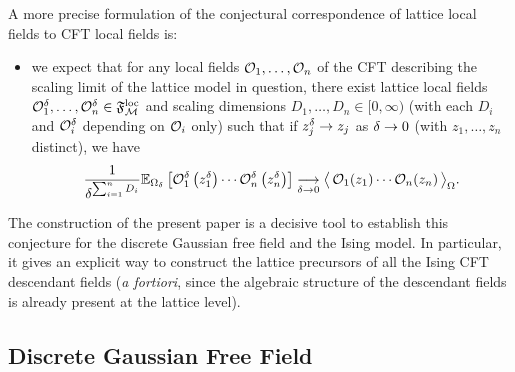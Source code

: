 \documentclass[12pt,oneside,english]{amsart}
\numberwithin{equation}{section}
\numberwithin{figure}{section}
\theoremstyle{plain}
\theoremstyle{plain}
\theoremstyle{plain}
\theoremstyle{plain}
\theoremstyle{remark}
\theoremstyle{definition}
\theoremstyle{plain}
\theoremstyle{plain}
\numberwithin{thm}{section}
\begin{document}
A more precise formulation of the conjectural correspondence of 
lattice local fields to CFT local fields is:
\begin{itemize}
\item we expect that for any local fields
${\mathcal{O}}_{1}, \ldots, {\mathcal{O}}_{n}$ of the CFT describing the scaling limit of 
the lattice model in question, %
there exist lattice local fields
$ {\mathcal{O}}_{1}^{ {\delta}}, \ldots,  {\mathcal{O}}_{n}^{ {\delta}} \in \mathfrak{F}^\mathrm{loc}_{\mathcal{M}}$ 
and scaling dimensions
$D_{1}, \ldots, D_{n} \in [0,\infty)$
(with each $D_{i}$ and $ {\mathcal{O}}_{i}^{ {\delta}}$ depending on $ {\mathcal{O}}_{i}$ 
only)
such that if $z_{j}^{ {\delta}} \to  z_{j}$ as $ {\delta} \to 0$
(with $z_1 , \ldots, z_n$ distinct), we have
\[
\frac{1}{ 
{\delta}^{\sum_{i=1}^{n}D_{i}}}  \mathbb{E}_{{{\Omega}}_{{\delta}}}\left[ {\mathcal{O}}_{1}^{ {\delta}}
\left(z_{1}^{{\delta}}\right) \cdots 
     {\mathcal{O}}_{n}^{{\delta}} \left(z_{n}^{{\delta}}\right)\right]
\underset{{\delta} \to 0}{\longrightarrow}
\big\langle\, {  {\mathcal{O}}_{1}(z_{1}) \cdots 
        {\mathcal{O}}_{n}(z_{n}) } \, \big\rangle_{{\Omega}}.
\]
\end{itemize}
The construction of the present paper is a decisive tool to establish this 
conjecture for the discrete Gaussian free field and
the Ising model. In particular, it gives an explicit way to construct
the lattice precursors of all the Ising CFT descendant fields 
(\emph{a fortiori},
since the algebraic structure of the descendant fields is already
present at the lattice level).

\subsection{\label{subsec:discrete-gaussian-free-field}
Discrete Gaussian Free Field}
\end{document}
